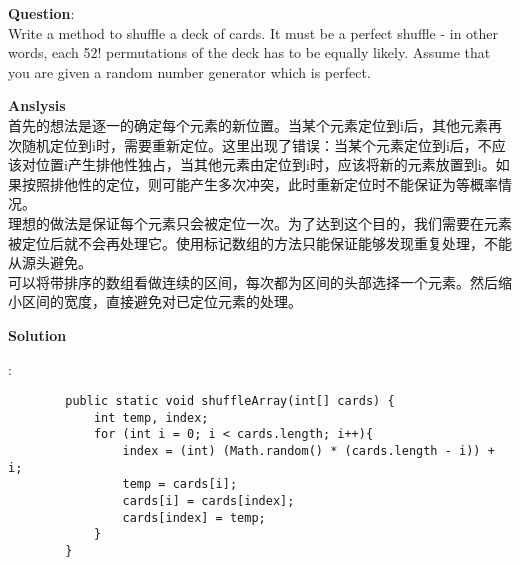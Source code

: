     
\begin{description}
    \item{\textbf{Question}}:\\%
		Write a method to shuffle a deck of cards. It must be a perfect shuffle - in other words, each 52! permutations of the deck has to be equally likely. Assume that you are given a random number generator which is perfect.	

    \item{\textbf{Anslysis}}\\
		首先的想法是逐一的确定每个元素的新位置。当某个元素定位到i后，其他元素再次随机定位到i时，需要重新定位。这里出现了错误：当某个元素定位到i后，不应该对位置i产生排他性独占，当其他元素由定位到i时，应该将新的元素放置到i。如果按照排他性的定位，则可能产生多次冲突，此时重新定位时不能保证为等概率情况。\\
		理想的做法是保证每个元素只会被定位一次。为了达到这个目的，我们需要在元素被定位后就不会再处理它。使用标记数组的方法只能保证能够发现重复处理，不能从源头避免。\\
		可以将带排序的数组看做连续的区间，每次都为区间的头部选择一个元素。然后缩小区间的宽度，直接避免对已定位元素的处理。
		
    \item{\textbf{Solution}}
	\item{} : \\
		\begin{lstlisting}
		public static void shuffleArray(int[] cards) {
			int temp, index;
			for (int i = 0; i < cards.length; i++){
				index = (int) (Math.random() * (cards.length - i)) + i;
				temp = cards[i];
				cards[i] = cards[index];
				cards[index] = temp;
			}
		}
		\end{lstlisting}

\end{description}

